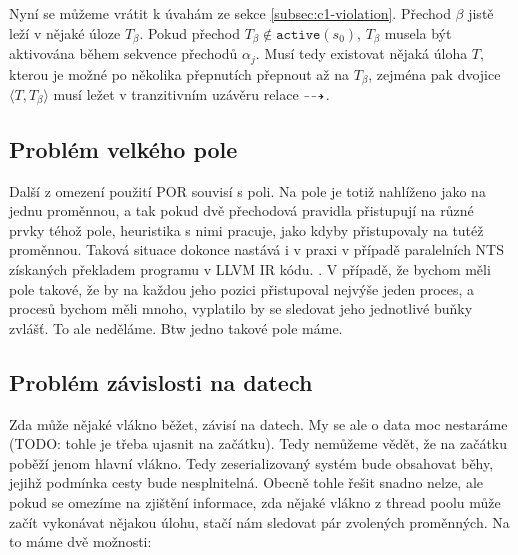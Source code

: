 \documentclass{fithesis2}
\newcommand{\tuple}[1]{\langle #1 \rangle}
\begin{document}
Nyní se můžeme vrátit k úvahám ze sekce \ref{subsec:c1-violation}. Přechod $\beta$ jistě leží v nějaké úloze $T_{\beta}$. Pokud přechod $T_{\beta} \not \in \texttt{active}(s_0)$, $T_{\beta}$ musela být aktivována během sekvence přechodů $\alpha_j$. Musí tedy existovat nějaká úloha $T$, kterou je možné po několika přepnutích přepnout až na $T_{\beta}$, zejména pak dvojice $\tuple{T, T_{\beta}}$ musí ležet v tranzitivním uzávěru relace $\dashrightarrow$.





\subsection{Problém velkého pole}
Další z omezení použití POR souvisí s poli. Na pole je totiž nahlíženo jako na jednu proměnnou, a tak pokud dvě přechodová pravidla přistupují na různé prvky téhož pole, heuristika s nimi pracuje, jako kdyby přistupovaly na tutéž proměnnou. Taková situace dokonce nastává i v praxi v případě paralelních NTS získaných překladem programu v LLVM IR kódu. .
V případě, že bychom měli pole takové, že by na každou jeho pozici přistupoval nejvýše jeden proces,
a procesů bychom měli mnoho, vyplatilo by se sledovat jeho jednotlivé buňky zvlášť. To ale neděláme. Btw jedno takové pole máme.

\subsection{Problém závislosti na datech}
Zda může nějaké vlákno běžet, závisí na datech. My se ale o data moc nestaráme (TODO: tohle je třeba ujasnit na začátku). Tedy nemůžeme vědět, že na začátku poběží jenom hlavní vlákno. Tedy zeserializovaný systém bude obsahovat běhy, jejihž podmínka cesty bude nesplnitelná. Obecně tohle řešit snadno nelze, ale pokud se omezíme na zjištění informace, zda nějaké vlákno z thread poolu může začít vykonávat nějakou úlohu, stačí nám sledovat pár zvolených proměnných. Na to máme dvě možnosti:
\end{document}
